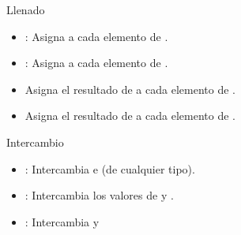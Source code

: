\begin{frame}[t]{Llenado}
\begin{itemize}
  \item {}: Asigna  a cada elemento de \cppid{[i,f)}.
  \item {}: Asigna  a cada elemento de \cppid{[i,i+n)}.
  \item {} Asigna el resultado de  a cada elemento de \cppid{[i,f)}.
  \item {} Asigna el resultado de  a cada elemento de \cppid{[i,i+n)}.
\end{itemize}
\end{frame}

\begin{frame}[t]{Intercambio}
\begin{itemize}
  \item {}: Intercambia  e  (de cualquier tipo).
  \item {}: Intercambia los valores de \cppid{[i,f)} y \cppid{[i2, i2+(f-i))}.
  \item {}: Intercambia  y 
\end{itemize}
\end{frame}
